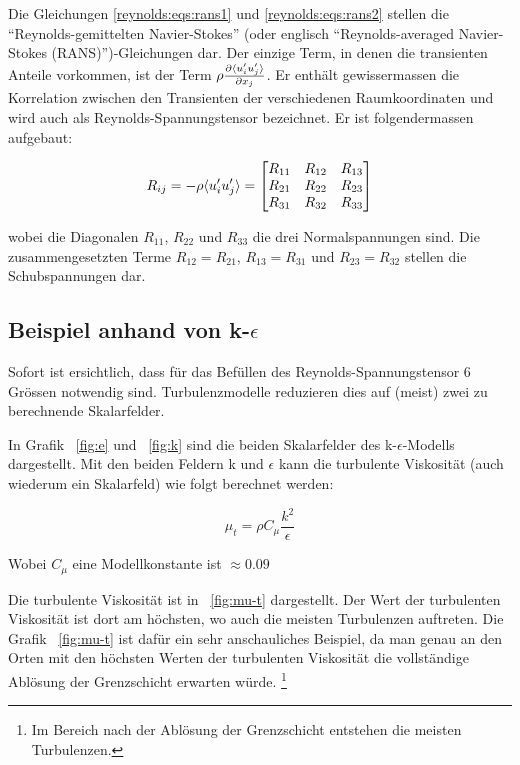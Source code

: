 Die Gleichungen \ref{reynolds:eqs:rans1} und \ref{reynolds:eqs:rans2} stellen die
``Reynolds-gemittelten Navier-Stokes'' (oder englisch ``Reynolds-averaged
Navier-Stokes (RANS)'')-Gleichungen dar. Der einzige Term, in denen die transienten
Anteile vorkommen, ist der Term $\rho \frac{\partial \langle u_i' u_j' \rangle}{\partial x_j}$.
Er enthält gewissermassen die Korrelation zwischen den Transienten der verschiedenen
Raumkoordinaten und wird auch als Reynolds-Spannungstensor bezeichnet. Er ist folgendermassen
aufgebaut:

\begin{equation}
    R_{ij} = -\rho\langle u'_i u'_j \rangle = \begin{bmatrix}
    R_{11} & R_{12} & R_{13} \\
    R_{21} & R_{22} & R_{23} \\
    R_{31} & R_{32} & R_{33}
    \end{bmatrix}
\end{equation}

wobei die Diagonalen $R_{11}$, $R_{22}$ und $R_{33}$ die drei Normalspannungen sind.
Die zusammengesetzten Terme $R_{12} = R_{21}$, $R_{13} = R_{31}$ und $R_{23} = R_{32}$ stellen
die Schubspannungen dar.

\subsection{Beispiel anhand von k-$\epsilon$}

Sofort ist ersichtlich, dass für das Befüllen des Reynolds-Spannungstensor 6 Grössen notwendig sind.
Turbulenzmodelle reduzieren dies auf (meist) zwei zu berechnende Skalarfelder.


In Grafik ~\ref{fig:e} und ~\ref{fig:k} sind die beiden Skalarfelder des k-$\epsilon$-Modells dargestellt.
Mit den beiden Feldern k und $\epsilon$ kann die turbulente Viskosität (auch wiederum ein Skalarfeld) wie
folgt berechnet werden:

\begin{equation}
    \label{eqs:Turbulent-Viscosity}
    \mu_t = \rho C_\mu \frac{k^2}{\epsilon}
\end{equation}

Wobei $C_\mu$ eine Modellkonstante ist $\approx 0.09$

Die turbulente Viskosität ist in ~\ref{fig:mu-t} dargestellt.
Der Wert der turbulenten Viskosität ist dort am höchsten, wo auch die meisten Turbulenzen auftreten.
Die Grafik ~\ref{fig:mu-t} ist dafür ein sehr anschauliches Beispiel,
da man genau an den Orten mit den höchsten Werten der turbulenten Viskosität die vollständige Ablösung
der Grenzschicht erwarten würde. 
\footnote{Im Bereich nach der Ablösung der Grenzschicht entstehen die meisten Turbulenzen.}

